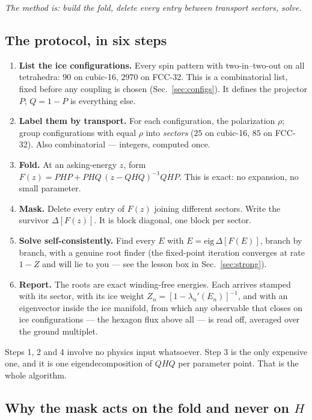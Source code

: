 \documentclass[11pt,a4paper]{article}
\begin{document}
\begin{center}
\emph{The method is: build the fold, delete every entry between transport
sectors, solve.}
\end{center}

\subsection{The protocol, in six steps}

\begin{enumerate}
\item \textbf{List the ice configurations.}  Every spin pattern with
two-in--two-out on all tetrahedra: $90$ on cubic-16, $2970$ on FCC-32.  This
is a combinatorial list, fixed before any coupling is chosen
(Sec.~\ref{sec:configs}).  It defines the projector $P$; $Q=1-P$ is
everything else.
\item \textbf{Label them by transport.}  For each configuration, the
polarization $\rho$; group configurations with equal $\rho$ into
\emph{sectors} ($25$ on cubic-16, $85$ on FCC-32).  Also combinatorial ---
integers, computed once.
\item \textbf{Fold.}  At an asking-energy $z$, form
$F(z)=PHP+PHQ\,(z-QHQ)^{-1}QHP$.  This is exact: no expansion, no small
parameter.
\item \textbf{Mask.}  Delete every entry of $F(z)$ joining different
sectors.  Write the survivor $\Delta[F(z)]$.  It is block diagonal, one
block per sector.
\item \textbf{Solve self-consistently.}  Find every $E$ with
$E=\mathrm{eig}\,\Delta[F(E)]$, branch by branch, with a genuine root finder
(the fixed-point iteration converges at rate $1-Z$ and will lie to you ---
see the lesson box in Sec.~\ref{sec:strong}).
\item \textbf{Report.}  The roots are exact winding-free energies.  Each
arrives stamped with its sector, with its ice weight
$Z_n=[1-\lambda_n'(E_n)]^{-1}$, and with an eigenvector inside the ice
manifold, from which any observable that closes on ice configurations ---
the hexagon flux above all --- is read off, averaged over the ground
multiplet.
\end{enumerate}

Steps 1, 2 and 4 involve no physics input whatsoever.  Step 3 is the only
expensive one, and it is one eigendecomposition of $QHQ$ per parameter
point.  That is the whole algorithm.

\subsection{Why the mask acts on the fold and never on \texorpdfstring{$H$}{H}}
\label{sec:emptyblock}
\end{document}
